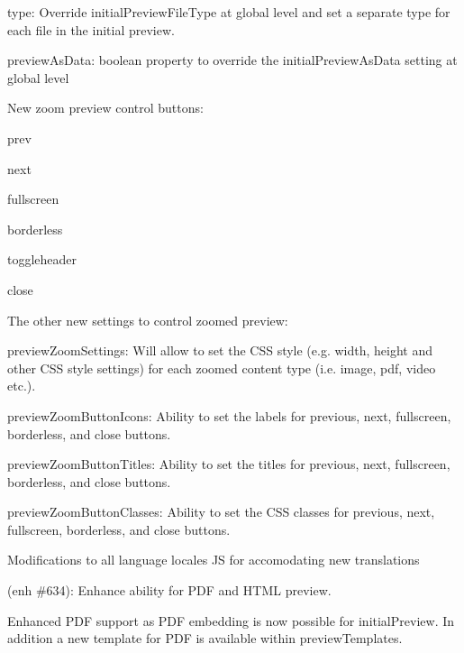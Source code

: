 \begin{DoxyItemize}
\begin{DoxyItemize}
\begin{DoxyItemize}
\item {\ttfamily type}\+: Override {\ttfamily initial\+Preview\+File\+Type} at global level and set a separate type for each file in the initial preview.
\item {\ttfamily preview\+As\+Data}\+: boolean property to override the {\ttfamily initial\+Preview\+As\+Data} setting at global level
\end{DoxyItemize}
\item New zoom preview control buttons\+:
\begin{DoxyItemize}
\item {\ttfamily prev}
\item {\ttfamily next}
\item {\ttfamily fullscreen}
\item {\ttfamily borderless}
\item {\ttfamily toggleheader}
\item {\ttfamily close}
\end{DoxyItemize}
\item The other new settings to control zoomed preview\+:
\begin{DoxyItemize}
\item {\ttfamily preview\+Zoom\+Settings}\+: Will allow to set the C\+SS style (e.\+g. width, height and other C\+SS style settings) for each zoomed content type (i.\+e. {\ttfamily image}, {\ttfamily pdf}, {\ttfamily video} etc.).
\item {\ttfamily preview\+Zoom\+Button\+Icons}\+: Ability to set the labels for previous, next, fullscreen, borderless, and close buttons.
\item {\ttfamily preview\+Zoom\+Button\+Titles}\+: Ability to set the titles for previous, next, fullscreen, borderless, and close buttons.
\item {\ttfamily preview\+Zoom\+Button\+Classes}\+: Ability to set the C\+SS classes for previous, next, fullscreen, borderless, and close buttons.
\end{DoxyItemize}
\item Modifications to all language locales JS for accomodating new translations
\end{DoxyItemize}
\item (enh \#634)\+: Enhance ability for P\+DF and H\+T\+ML preview.
\begin{DoxyItemize}
\item Enhanced P\+DF support as P\+DF embedding is now possible for {\ttfamily initial\+Preview}. In addition a new template for P\+DF is available within {\ttfamily preview\+Templates}.

\end{DoxyItemize}
\end{DoxyItemize}

